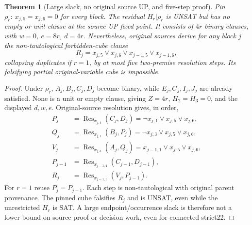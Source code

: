 \documentclass[10pt]{article}
\newtheorem{theorem}{Theorem}
\begin{document}
\begin{theorem}[Large slack, no original source UP, and five-step proof]
Pin $\rho_r:\ x_{j,5}=x_{j,6}=0$ for every block. The residual $H_r|\rho_r$ is UNSAT but has no empty or unit clause at the source UP fixed point. It consists of $4r$ binary clauses, with $w=0$, $e=8r$, $d=4r$. Nevertheless, original sources derive for any block $j$ the non-tautological forbidden-cube clause
\[
R_j=x_{j,5}\vee x_{j,6}\vee x_{j-1,5}\vee x_{j-1,6},
\]
collapsing duplicates if $r=1$, by at most five two-premise resolution steps. Its falsifying partial original-variable cube is impossible.
\end{theorem}
\begin{proof}
Under $\rho_r$, $A_j,B_j,C_j,D_j$ become binary, while $E_j,G_j,I_j,J_j$ are already satisfied. None is a unit or empty clause, giving $Z=4r$, $H_2=H_3=0$, and the displayed $d,w,e$. Original-source resolution gives, in order,
\[
\begin{aligned}
P_j&=\operatorname{Res}_{x_{j,4}}(C_j,D_j)
      =\neg x_{j,1}\vee x_{j,5}\vee x_{j,6},\\
Q_j&=\operatorname{Res}_{x_{j,1}}(B_j,P_j)
      =\neg x_{j,3}\vee x_{j,5}\vee x_{j,6},\\
V_j&=\operatorname{Res}_{x_{j,3}}(A_j,Q_j)
      =x_{j-1,1}\vee x_{j,5}\vee x_{j,6},\\
P_{j-1}&=\operatorname{Res}_{x_{j-1,4}}(C_{j-1},D_{j-1}),\\
R_j&=\operatorname{Res}_{x_{j-1,1}}(V_j,P_{j-1}).
\end{aligned}
\]
For $r=1$ reuse $P_j=P_{j-1}$. Each step is non-tautological with original parent provenance. The pinned cube falsifies $R_j$ and is UNSAT, even while the unrestricted $H_r$ is SAT. A large endpoint/occurrence slack is therefore not a lower bound on source-proof or decision work, even for connected strict22.
\end{proof}
\end{document}
